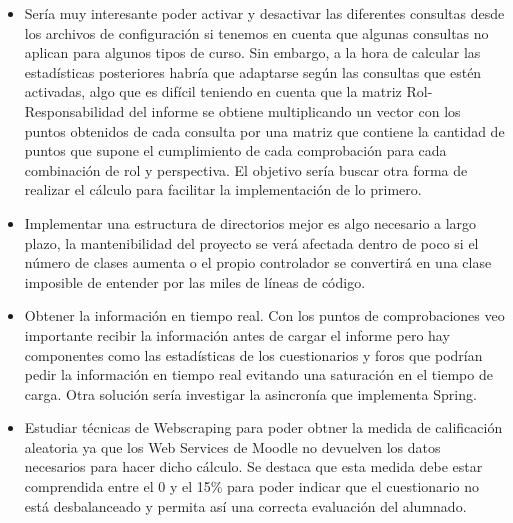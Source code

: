 \begin{itemize}
	\item
	Sería muy interesante poder activar y desactivar las diferentes consultas desde los archivos de configuración si tenemos en cuenta que algunas consultas no aplican para algunos tipos de curso. Sin embargo, a la hora de calcular las estadísticas posteriores habría que adaptarse según las consultas que estén activadas, algo que es difícil teniendo en cuenta que la matriz Rol-Responsabilidad del informe se obtiene multiplicando un vector con los puntos obtenidos de cada consulta por una matriz que contiene la cantidad de puntos que supone el cumplimiento de cada comprobación para cada combinación de rol y perspectiva. El objetivo sería buscar otra forma de realizar el cálculo para facilitar la implementación de lo primero.
	\item
	Implementar una estructura de directorios mejor es algo necesario a largo plazo, la mantenibilidad del proyecto se verá afectada dentro de poco si el número de clases aumenta o el propio controlador se convertirá en una clase imposible de entender por las miles de líneas de código.
	\item
	Obtener la información en tiempo real. Con los puntos de comprobaciones veo importante recibir la información antes de cargar el informe pero hay componentes como las estadísticas de los cuestionarios y foros que podrían pedir la información en tiempo real evitando una saturación en el tiempo de carga. Otra solución sería investigar la asincronía que implementa Spring.
    \item 
    Estudiar técnicas de Webscraping para poder obtner la medida de calificación aleatoria ya que los Web Services de Moodle no devuelven los datos necesarios para hacer dicho cálculo. Se destaca que esta medida debe estar comprendida entre el 0 y el 15\% para poder indicar que el cuestionario no está desbalanceado y permita así una correcta evaluación del alumnado.
\end{itemize}